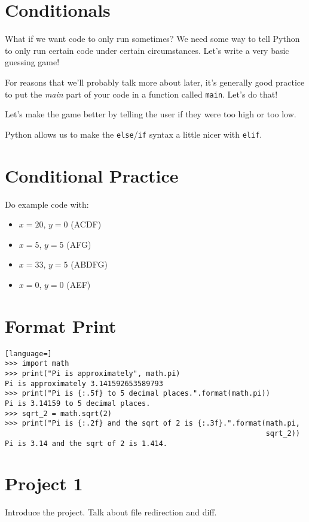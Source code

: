 \documentclass[12pt]{article}
\begin{document}
\section{Conditionals}

What if we want code to only run sometimes?  We need some way to tell Python to
only run certain code under certain circumstances.  Let's write a very basic
guessing game!



\noindent
For reasons that we'll probably talk more about later, it's generally good
practice to put the \emph{main} part of your code in a function called
\lstinline{main}.  Let's do that!



\noindent
Let's make the game better by telling the user if they were too high or too
low.



\newpage
\noindent
Python allows us to make the \lstinline{else}/\lstinline{if} syntax a little
nicer with \lstinline{elif}.



\section{Conditional Practice}

Do example code with:
\begin{itemize}
   \item $x = 20$, $y = 0$ (ACDF)
   \item $x = 5$, $y = 5$ (AFG)
   \item $x = 33$, $y = 5$ (ABDFG)
   \item $x = 0$, $y = 0$ (AEF)
\end{itemize}

\section{Format Print}

\begin{lstlisting}[language=]
>>> import math
>>> print("Pi is approximately", math.pi)
Pi is approximately 3.141592653589793
>>> print("Pi is {:.5f} to 5 decimal places.".format(math.pi))
Pi is 3.14159 to 5 decimal places.
>>> sqrt_2 = math.sqrt(2)
>>> print("Pi is {:.2f} and the sqrt of 2 is {:.3f}.".format(math.pi,
                                                             sqrt_2))
Pi is 3.14 and the sqrt of 2 is 1.414.
\end{lstlisting}

\section{Project 1}

Introduce the project.  Talk about file redirection and diff.
\end{document}
